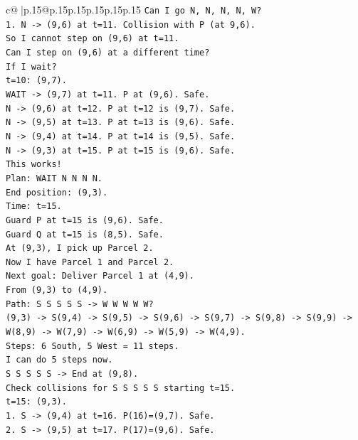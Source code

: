 \documentclass{article}
\begin{document}
{\begin{supertabular}{c@{$\;$}|p{.15\linewidth}@{}p{.15\linewidth}p{.15\linewidth}p{.15\linewidth}p{.15\linewidth}p{.15\linewidth}}
{{{\texttt{Can I go N, N, N, N, W?} \\
\texttt{1. N {-}> (9,6) at t=11. Collision with P (at 9,6).} \\
\texttt{So I cannot step on (9,6) at t=11.} \\
\texttt{Can I step on (9,6) at a different time?} \\
\texttt{If I wait?} \\
\texttt{t=10: (9,7).} \\
\texttt{WAIT {-}> (9,7) at t=11. P at (9,6). Safe.} \\
\texttt{N {-}> (9,6) at t=12. P at t=12 is (9,7). Safe.} \\
\texttt{N {-}> (9,5) at t=13. P at t=13 is (9,6). Safe.} \\
\texttt{N {-}> (9,4) at t=14. P at t=14 is (9,5). Safe.} \\
\texttt{N {-}> (9,3) at t=15. P at t=15 is (9,6). Safe.} \\
\texttt{This works!} \\
\texttt{Plan: WAIT N N N N.} \\
\texttt{End position: (9,3).} \\
\texttt{Time: t=15.} \\
\texttt{Guard P at t=15 is (9,6). Safe.} \\
\texttt{Guard Q at t=15 is (8,5). Safe.} \\
\texttt{At (9,3), I pick up Parcel 2.} \\
\texttt{Now I have Parcel 1 and Parcel 2.} \\
\texttt{Next goal: Deliver Parcel 1 at (4,9).} \\
\texttt{From (9,3) to (4,9).} \\
\texttt{Path: S S S S S {-}> W W W W W?} \\
\texttt{(9,3) {-}> S(9,4) {-}> S(9,5) {-}> S(9,6) {-}> S(9,7) {-}> S(9,8) {-}> S(9,9) {-}> W(8,9) {-}> W(7,9) {-}> W(6,9) {-}> W(5,9) {-}> W(4,9).} \\
\texttt{Steps: 6 South, 5 West = 11 steps.} \\
\texttt{I can do 5 steps now.} \\
\texttt{S S S S S {-}> End at (9,8).} \\
\texttt{Check collisions for S S S S S starting t=15.} \\
\texttt{t=15: (9,3).} \\
\texttt{1. S {-}> (9,4) at t=16. P(16)=(9,7). Safe.} \\
\texttt{2. S {-}> (9,5) at t=17. P(17)=(9,6). Safe.} \\
}}}
\end{supertabular}}
\end{document}

